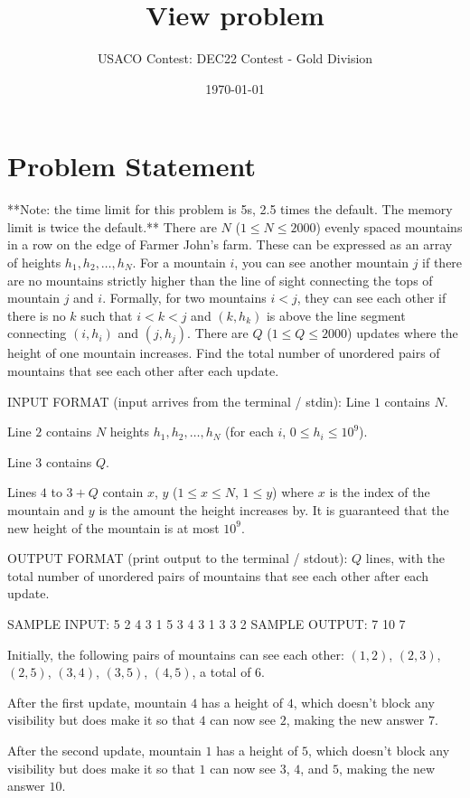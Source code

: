 \documentclass[12pt]{article}
\title{View problem}
\author{USACO Contest: DEC22 Contest - Gold Division}
\date{\today}
\begin{document}
\maketitle

\section*{Problem Statement}

**Note: the time limit for this problem is 5s, 2.5 times the default. The
memory limit is twice the default.**
There are $N$ ($1 \leq N \leq 2000$) evenly spaced mountains in a row on the edge of 
Farmer  John's farm.  These can be expressed as an array of heights
$h_1,h_2,\dots,h_N$. For a mountain $i$, you can see another mountain $j$ if
there are no mountains strictly higher than the line of sight connecting the
tops of mountain $j$ and $i$. Formally, for two mountains $i < j$, they can see
each other if there is no $k$ such that $i < k < j$ and $(k, h_k)$ is above the
line segment connecting $(i, h_i)$ and $(j, h_j)$. There are $Q$
($1 \leq Q \leq 2000$) updates where the height of one mountain increases. Find
the total number of unordered pairs of mountains that see each other after each
update.

INPUT FORMAT (input arrives from the terminal / stdin):
Line $1$ contains $N$.

Line $2$ contains $N$ heights $h_1,h_2,\dots,h_N$ (for each $i$,
$0 \leq h_i \leq 10^9$).

Line $3$ contains $Q$.

Lines $4$ to $3+Q$ contain $x$, $y$ ($1 \leq x \leq N$, $1 \leq y$) where $x$ is
the index of the mountain and $y$ is the amount the height increases by. It is
guaranteed that the new height of the mountain is at most $10^9$.

OUTPUT FORMAT (print output to the terminal / stdout):
$Q$ lines, with the total number of unordered pairs of mountains that see each
other after each update.

SAMPLE INPUT:
5
2 4 3 1 5
3
4 3
1 3
3 2
SAMPLE OUTPUT: 
7
10
7

Initially, the following pairs of mountains can see each other: $(1, 2)$,
$(2, 3)$, $(2, 5)$, $(3, 4)$, $(3, 5)$, $(4, 5)$, a total of $6$.

After the first update, mountain $4$ has a height of $4$, which doesn't block
any visibility but does make it so that $4$ can now see $2$, making the new
answer $7$.

After the second update, mountain $1$ has a height of $5$, which doesn't block
any visibility but does make it so that $1$ can now see $3$, $4$, and $5$,
making the new answer $10$.
\end{document}
